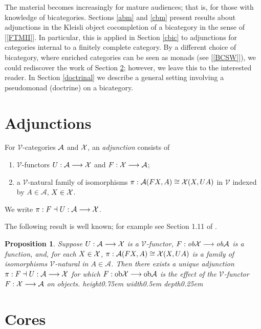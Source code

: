 \documentclass[a4paper,10pt]{article}
\newcommand{\qed}{\nobreak \ifvmode \relax \else
      \ifdim\lastskip<1.5em \hskip-\lastskip
      \hskip1.5em plus0em minus0.5em \fi \nobreak
      \vrule height0.75em width0.5em depth0.25em\fi}
\newtheorem{proposition}[theorem]{Proposition}
\newcommand{\ba}{{\cal{A}}}
\newcommand{\bx}{{\cal{X}}}
\newcommand{\ev}{\mathcal{V} }
\numberwithin{equation}{section}
\begin{document}
The material becomes increasingly for mature audiences; that is, for those with knowledge of bicategories. Sections \ref{abm} and \ref{cbm} present results about adjunctions in the Kleisli object cocompletion of a bicategory in the sense of [\ref{FTMII}]. In particular, this is applied in Section \ref{cbic} to adjunctions for categories internal to a finitely complete category. By a different choice of bicategory, where enriched categories can be seen as monads (see [\ref{BCSW}]), we could rediscover the work of Section \ref{Crs}; however, we leave this to the interested reader.  In Section \ref{doctrinal} we describe a general setting involving a pseudomonad (doctrine) on a bicategory.   


\section{Adjunctions}\label{adj}

For $\ev$-categories $\ba$ and $\bx$, an
{\it adjunction} consists of
\begin{enumerate}
\item  $\ev$-functors $U:\ba\longrightarrow \bx$
and $F:\bx\longrightarrow \mathcal{A}$;
\item a $\ev$-natural family of isomorphisms $\pi :\mathcal{A}(
F X,A) \cong \bx( X,U A) $ in $\ev$ indexed by $A\in
\mathcal{A}$, $X\in \bx$.
\end{enumerate}
We write $\pi :F\dashv U:\mathcal{A}\longrightarrow \bx$.


The following result is well known; for example see Section 1.11
of \cite{KellyBook}.
\begin{proposition}
Suppose $U:\mathcal{A}\longrightarrow \bx$ is a $\ev$-functor,
$F:\mathit{ob}\bx\longrightarrow \mathit{ob}\mathcal{A}$
is a function, and, for each $X\in \bx$, $\pi :\mathcal{A}(
F X,A) \cong \bx( X,U A) $ is a family of isomorphisms $\ev$-natural
in $A\in \mathcal{A}$. Then there exists a unique adjunction $\pi
:F\dashv U:\mathcal{A}\longrightarrow \bx$ for which $F:\mathrm{ob\bx}\longrightarrow
\mathrm{ob\mathcal{A}}$ is the effect of the $\ev$-functor
$F:\bx\longrightarrow \mathcal{A}$ on objects. \qed \ \ \ \ \ \ \label{XRef-Proposition-121173012}
\end{proposition}

\section{Cores}\label{Crs}
\end{document}
